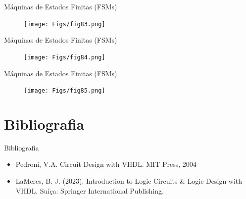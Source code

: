 \documentclass[aspectratio=169]{beamer}
\begin{document}
\begin{frame}{Máquinas de Estados Finitas (FSMs)}
	\justifying
	
	
	\begin{figure}[h]
		\centering
		\texttt{[image: Figs/fig83.png]}
	\end{figure}
	
\end{frame}
\begin{frame}{Máquinas de Estados Finitas (FSMs)}
	\justifying
	
	
	\begin{figure}[h]
		\centering
		\texttt{[image: Figs/fig84.png]}
	\end{figure}
	
\end{frame}
\begin{frame}{Máquinas de Estados Finitas (FSMs)}
	\justifying
	
	
	\begin{figure}[h]
		\centering
		\texttt{[image: Figs/fig85.png]}
	\end{figure}
	
\end{frame}
\section{Bibliografia}
\begin{frame}{Bibliografia}
	\justifying
	
	\begin{itemize}
		\item Pedroni, V.A. Circuit Design with VHDL. MIT Press, 2004
		\item LaMeres, B. J. (2023). Introduction to Logic Circuits \& Logic Design with VHDL. Suíça: Springer International Publishing.

	\end{itemize}
	
\end{frame}

\end{document}
